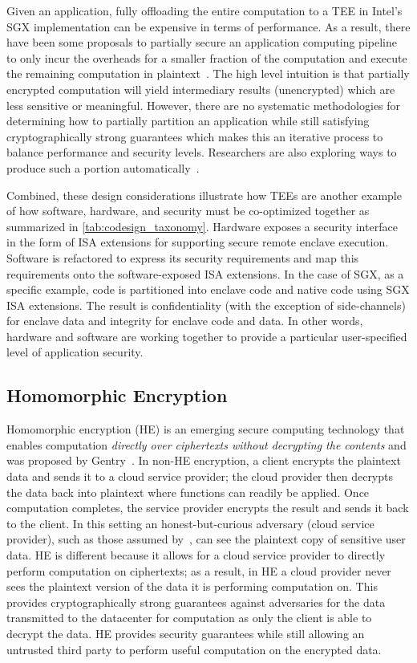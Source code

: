 Given an application, fully offloading the entire computation to a TEE in Intel's SGX implementation can be expensive in terms of performance.
As a result, there have been some proposals to partially secure an application computing pipeline to only incur the overheads for a smaller fraction of the computation and execute the remaining computation in plaintext~\cite{ryffel2019partially, narra2019privacy}.
The high level intuition is that partially encrypted computation will yield intermediary results (unencrypted) which are less sensitive or meaningful.
However, there are no systematic methodologies for determining how to partially partition an application while still satisfying cryptographically strong guarantees which makes this an iterative process to balance performance and security levels.
Researchers are also exploring ways to produce such a portion automatically~\cite{lind2017glamdring}.

Combined, these design considerations illustrate how TEEs are another example of how software, hardware, and security must be co-optimized together as summarized in \autoref{tab:codesign_taxonomy}.
Hardware exposes a security interface in the form of ISA extensions for supporting secure remote enclave execution.
Software is refactored to express its security requirements and map this requirements onto the software-exposed ISA extensions.
In the case of SGX, as a specific example, code is partitioned into enclave code and native code using SGX ISA extensions.
The result is confidentiality (with the exception of side-channels) for enclave data and integrity for enclave code and data.
In other words, hardware and software are working together to provide a particular user-specified level of application security.

\subsection{Homomorphic Encryption}

Homomorphic encryption (HE) is an emerging secure computing technology that enables computation \textit{directly over ciphertexts without decrypting the contents} and was proposed by Gentry~\cite{gentry09, gentry10}.
In non-HE encryption, a client encrypts the plaintext data and sends it to a cloud service provider; the cloud provider then decrypts the data back into plaintext where functions can readily be applied.
Once computation completes, the service provider encrypts the result and sends it back to the client.
In this setting an honest-but-curious adversary (cloud service provider), such as those assumed by~\cite{gazelle, cryptonets}, can see the plaintext copy of sensitive user data.
HE is different because it allows for a cloud service provider to directly perform computation on ciphertexts; as a result, in HE a cloud provider never sees the plaintext version of the data it is performing computation on.
This provides cryptographically strong guarantees against adversaries for the data transmitted to the datacenter for computation as only the client is able to decrypt the data.
HE provides security guarantees while still allowing an untrusted third party to perform useful computation on the encrypted data.

